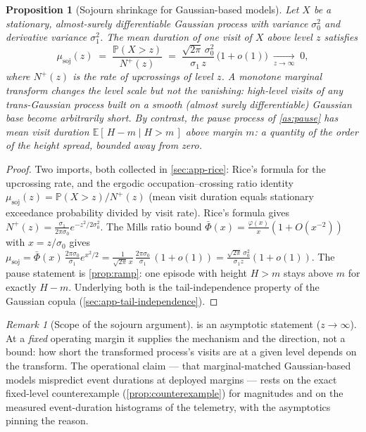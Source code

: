 \documentclass[11pt, a4paper]{article}
\theoremstyle{definition}
\theoremstyle{plain}
\newtheorem{proposition}[theorem]{Proposition}
\theoremstyle{remark}
\newtheorem{remark}{Remark}[section]
\newcommand{\E}{\mathbb{E}}
\newcommand{\Prob}{\mathbb{P}}
\begin{document}
\begin{proposition}[Sojourn shrinkage for Gaussian-based models]
\label{prop:sojourn}
Let $X$ be a stationary, almost-surely differentiable Gaussian process
with variance $\sigma_0^2$ and derivative variance $\sigma_1^2$.  The
mean duration of one visit of $X$ above level $z$ satisfies
\begin{equation}\label{eq:sojourn}
  \mu_{\mathrm{soj}}(z)
  \;=\;
  \frac{\Prob(X > z)}{N^+(z)}
  \;=\;
  \frac{\sqrt{2\pi}\,\sigma_0^2}{\sigma_1\, z}\,\bigl(1+o(1)\bigr)
  \;\xrightarrow[z\to\infty]{}\; 0,
\end{equation}
where $N^+(z)$ is the rate of upcrossings of level $z$.  A monotone
marginal transform changes the level scale but not the vanishing:
high-level visits of any trans-Gaussian process built on a smooth
(almost surely differentiable) Gaussian base become arbitrarily short.
By contrast, the pause process of \cref{as:pause} has mean visit duration
$\E[\,H - m \mid H > m\,]$ above margin $m$: a quantity of the order of
the height spread, bounded away from zero.
\end{proposition}

\begin{proof}
Two imports, both collected in \cref{sec:app-rice}: Rice's formula for
the upcrossing rate, and the ergodic occupation--crossing ratio
identity $\mu_{\mathrm{soj}}(z) = \Prob(X>z)/N^+(z)$ (mean visit
duration equals stationary exceedance probability divided by visit
rate).  Rice's formula gives
$N^+(z) = \frac{\sigma_1}{2\pi\sigma_0} e^{-z^2/2\sigma_0^2}$.
The Mills ratio bound
$\bar\Phi(x) = \frac{\varphi(x)}{x}(1+O(x^{-2}))$ with $x = z/\sigma_0$
gives
$\mu_{\mathrm{soj}}
 = \bar\Phi(x)\,\frac{2\pi\sigma_0}{\sigma_1}e^{x^2/2}
 = \frac{1}{\sqrt{2\pi}\,x}\,\frac{2\pi\sigma_0}{\sigma_1}\,(1+o(1))
 = \frac{\sqrt{2\pi}\,\sigma_0^2}{\sigma_1 z}(1+o(1))$.
The pause statement is \cref{prop:ramp}: one episode with height $H > m$
stays above $m$ for exactly $H - m$.  Underlying both is the
tail-independence property of the Gaussian copula
(\cref{sec:app-tail-independence}).
\end{proof}

\begin{remark}[Scope of the sojourn argument]\label{rem:sojourn-scope}
 is an asymptotic statement ($z \to \infty$).  At a
\emph{fixed} operating margin it supplies the mechanism and the
direction, not a bound: how short the transformed process's visits are
at a given level depends on the transform.  The operational claim ---
that marginal-matched Gaussian-based models mispredict event durations
at deployed margins --- rests on the exact fixed-level counterexample
(\cref{prop:counterexample}) for magnitudes and on the measured
event-duration histograms of the telemetry, with the asymptotics
pinning the reason.
\end{remark}
\end{document}
